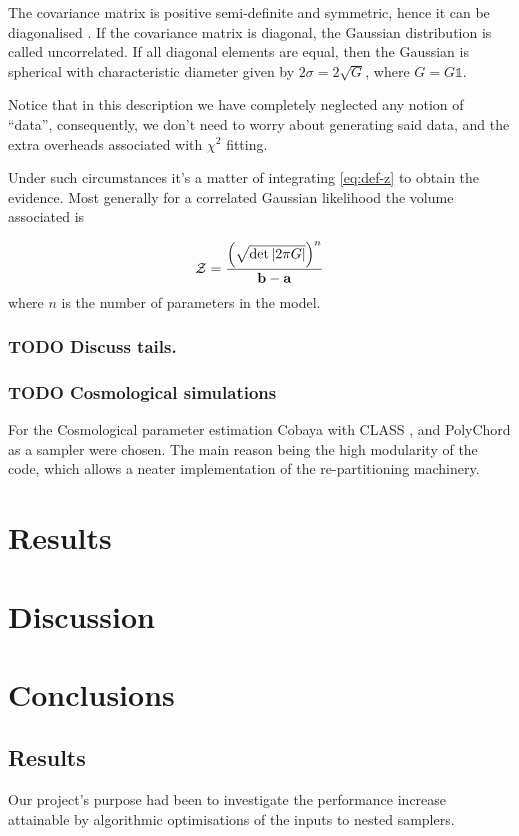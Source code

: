 \documentclass[usenatbib]{mnras}
\begin{document}
The covariance matrix is positive semi-definite and symmetric,
hence it can be diagonalised \citep{taboga2017lectures}. If the
covariance matrix is diagonal, the Gaussian distribution is called
uncorrelated. If all diagonal elements are equal, then the
Gaussian is spherical with characteristic diameter given by \(2
	\sigma = 2\sqrt{G}\), where \(G = G \mathds{1}\).

Notice that in this description we have completely neglected any
notion of ``data'', consequently, we don't need to worry about
generating said data, and the extra overheads associated with
\(\chi^2\) fitting.

Under such circumstances it's a matter of integrating \ref{eq:def-z}
to obtain the evidence. Most generally for a correlated Gaussian
likelihood the volume associated is 

\begin{equation}\label{eq:evidence}
   {\cal Z} = \frac{\left( \sqrt{ \det \left| 2\pi G \right|} \right)^{n}}{\mathbf{b}-\mathbf{a}}  
\end{equation}
where \(n\) is the number of parameters in the model.
\subsubsection{{\bfseries\sffamily TODO} Discuss tails.}
\label{sec:org9ff7f96}
\subsubsection{{\bfseries\sffamily TODO} Cosmological simulations}
\label{sec:org67f93b3}
For the Cosmological parameter estimation Cobaya \citep{cobaya} with
CLASS \citep{Blas_2011}, and PolyChord \citep{polychord} as a sampler
were chosen. The main reason being the high modularity of the code,
which allows a neater implementation of the re-partitioning
machinery.
\section{Results}
\label{sec:orgbfe7c7b}
\section{Discussion}
\label{sec:orga587c6e}
\section{Conclusions}
\label{sec:org6f3e6ef}

\subsection{Results}
\label{sec:orgbc26500}
Our project's purpose had been to investigate the performance
increase attainable by algorithmic optimisations of the inputs to
nested samplers. 
\end{document}
